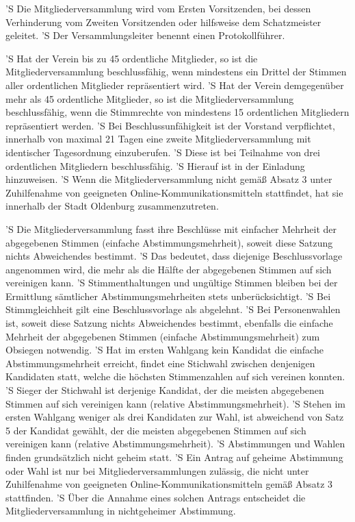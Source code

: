 \documentclass[a4paper,10pt]{scrreprt}
\begin{document}
\begin{contract}
'S Die Mitgliederversammlung wird vom Ersten Vorsitzenden, bei dessen
Verhinderung vom Zweiten Vorsitzenden oder hilfsweise dem Schatzmeister
geleitet.
'S Der Versammlungsleiter benennt einen Protokollführer.

'S Hat der Verein bis zu 45 ordentliche Mitglieder, so ist die
Mitgliederversammlung beschlussfähig, wenn mindestens ein Drittel der Stimmen
aller ordentlichen Mitglieder repräsentiert wird.
'S Hat der Verein demgegenüber mehr als 45 ordentliche Mitglieder, so ist die
Mitgliederversammlung beschlussfähig, wenn die Stimmrechte von mindestens 15
ordentlichen Mitgliedern repräsentiert werden.
'S Bei Beschlussunfähigkeit ist der Vorstand verpflichtet, innerhalb von
maximal 21 Tagen eine zweite Mitgliederversammlung mit identischer Tagesordnung
einzuberufen.
'S Diese ist bei Teilnahme von drei ordentlichen Mitgliedern beschlussfähig.
'S Hierauf ist in der Einladung hinzuweisen.
'S Wenn die Mitgliederversammlung nicht gemäß Absatz 3 unter Zuhilfenahme von
geeigneten Online-Kommunikationsmitteln stattfindet, hat sie innerhalb der
Stadt Oldenburg zusammenzutreten.

'S Die Mitgliederversammlung fasst ihre Beschlüsse mit einfacher Mehrheit der
abgegebenen Stimmen (einfache Abstimmungsmehrheit), soweit diese Satzung nichts
Abweichendes bestimmt.
'S Das bedeutet, dass diejenige Beschlussvorlage angenommen wird, die mehr als
die Hälfte der abgegebenen Stimmen auf sich vereinigen kann.
'S Stimmenthaltungen und ungültige Stimmen bleiben bei der Ermittlung
sämtlicher Abstimmungsmehrheiten stets unberücksichtigt.
'S Bei Stimmgleichheit gilt eine Beschlussvorlage als abgelehnt.
'S Bei Personenwahlen ist, soweit diese Satzung nichts Abweichendes bestimmt,
ebenfalls die einfache Mehrheit der abgegebenen Stimmen (einfache
Abstimmungsmehrheit) zum Obsiegen notwendig.
'S Hat im ersten Wahlgang kein Kandidat die einfache Abstimmungsmehrheit
erreicht, findet eine Stichwahl zwischen denjenigen Kandidaten statt, welche
die höchsten Stimmenzahlen auf sich vereinen konnten.
'S Sieger der Stichwahl ist derjenige Kandidat, der die meisten abgegebenen
Stimmen auf sich vereinigen kann (relative Abstimmungsmehrheit).
'S Stehen im ersten Wahlgang weniger als drei Kandidaten zur Wahl, ist
abweichend von Satz 5 der Kandidat gewählt, der die meisten abgegebenen Stimmen
auf sich vereinigen kann (relative Abstimmungsmehrheit).
'S Abstimmungen und Wahlen finden grundsätzlich nicht geheim statt.
'S Ein Antrag auf geheime Abstimmung oder Wahl ist nur bei
Mitgliederversammlungen zulässig, die nicht unter Zuhilfenahme von geeigneten
Online-Kommunikationsmitteln gemäß Absatz 3 stattfinden.
'S Über die Annahme eines solchen Antrags entscheidet die Mitgliederversammlung
in nichtgeheimer Abstimmung.


\end{contract}
\end{document}
